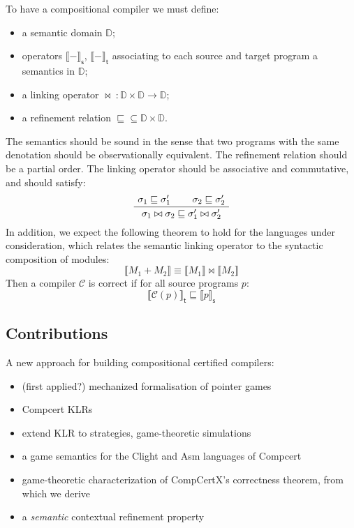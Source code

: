 \documentclass[sigplan,10pt,review,anonymous]{acmart}
\newcommand{\kw}[1]{\ensuremath{ \textsf{#1} }}
\begin{document}
To have a compositional compiler we must define:
\begin{itemize}
\item a semantic domain $\mathbb{D}$;
\item operators $\llbracket - \rrbracket_\kw{s}$, $\llbracket - \rrbracket_\kw{t}$
  associating to each source and target program a semantics in $\mathbb{D}$;
\item a linking operator $\bowtie \: : \mathbb{D} \times \mathbb{D} \rightarrow \mathbb{D}$;
\item a refinement relation ${\sqsubseteq} \subseteq \mathbb{D} \times \mathbb{D}$.
\end{itemize}
The semantics should be sound in the sense that
two programs with the same denotation should be observationally equivalent.
The refinement relation should be a partial order.
The linking operator should be associative and commutative,
and should satisfy:
\[
  \AxiomC{$\sigma_1 \sqsubseteq \sigma_1'$}
  \AxiomC{$\sigma_2 \sqsubseteq \sigma_2'$}
  \BinaryInfC{$\sigma_1 \bowtie \sigma_2 \sqsubseteq \sigma_1' \bowtie \sigma_2'$}
  \DisplayProof
\]
In addition,
we expect the following theorem to hold
for the languages under consideration,
which relates the semantic linking operator to
the syntactic composition of modules:
\[
  \llbracket M_1 + M_2 \rrbracket \equiv
  \llbracket M_1 \rrbracket \bowtie \llbracket M_2 \rrbracket
\]
Then a compiler $\mathcal{C}$ is correct if
for all source programs $p$:
\[
  \llbracket \mathcal{C}(p) \rrbracket_\kw{t} \sqsubseteq
  \llbracket p \rrbracket_\kw{s}
\]

\subsection{Contributions}

A new approach for building compositional certified compilers:
\begin{itemize}
\item (first applied?) mechanized formalisation of pointer games
\item Compcert KLRs
\item extend KLR to strategies, game-theoretic simulations
\item a game semantics for the Clight and Asm languages of Compcert
\item game-theoretic characterization of CompCertX's correctness theorem, from which we derive
\item a \emph{semantic} contextual refinement property
\end{itemize}
\end{document}

